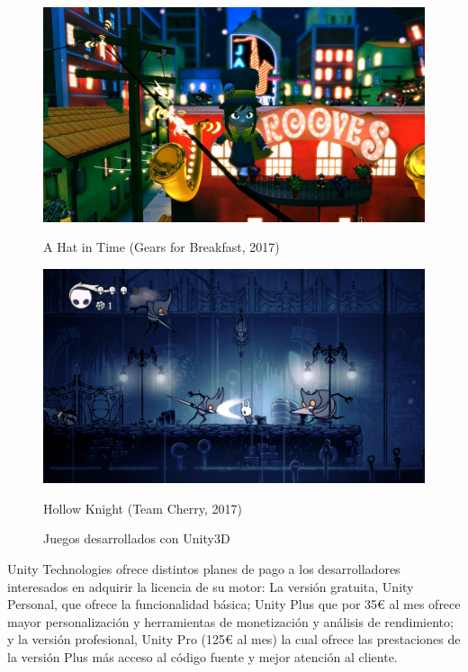 \begin{figure}[!htb]
   \begin{minipage}{0.50\textwidth}
     \centering
     \includegraphics[width=0.9\linewidth, left]{images/estadodelarte/motores/hat-in-time}
     \caption{A Hat in Time (Gears for Breakfast, 2017)}
   \end{minipage}\hfill
   \begin {minipage}{0.50\textwidth}
     \centering
     \includegraphics[width=0.9\linewidth, right]{images/estadodelarte/motores/hollow-knight}
     \caption{Hollow Knight (Team Cherry, 2017)}
   \end{minipage}
   \caption{Juegos desarrollados con Unity3D}
\end{figure}

Unity Technologies ofrece distintos planes de pago a los desarrolladores interesados en adquirir la licencia de su motor: La versión gratuita, Unity Personal, que ofrece la funcionalidad básica; Unity Plus que por 35€ al mes ofrece mayor personalización y herramientas de monetización y análisis de rendimiento; y la versión profesional, Unity Pro (125€ al mes) la cual ofrece las prestaciones de la versión Plus más acceso al código fuente y mejor atención al cliente. 

